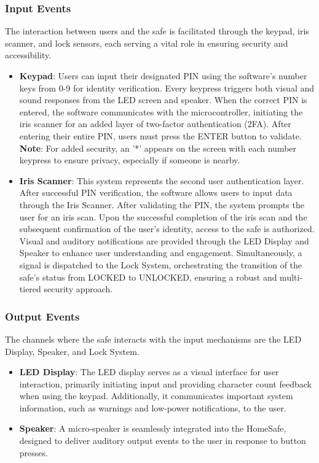\documentclass{article}
\begin{document}
\subsubsection{Input Events}
The interaction between users and the safe is facilitated through the keypad, iris scanner, and lock sensors, each serving a vital role in ensuring security and accessibility.

\begin{itemize}
    \item \textbf{Keypad}: Users can input their designated PIN using the software's number keys from 0-9 for identity verification. Every keypress triggers both visual and sound responses from the LED screen and speaker. When the correct PIN is entered, the software communicates with the microcontroller, initiating the iris scanner for an added layer of two-factor authentication (2FA). After entering their entire PIN, users must press the ENTER button to validate. \textbf{Note}: For added security, an '*' appears on the screen with each number keypress to ensure privacy, especially if someone is nearby.
    \item \textbf{Iris Scanner}: This system represents the second user authentication layer. After successful PIN verification, the software allows users to input data through the Iris Scanner. After validating the PIN, the system prompts the user for an iris scan. Upon the successful completion of the iris scan and the subsequent confirmation of the user's identity, access to the safe is authorized. Visual and auditory notifications are provided through the LED Display and Speaker to enhance user understanding and engagement. Simultaneously, a signal is dispatched to the Lock System, orchestrating the transition of the safe's status from LOCKED to UNLOCKED, ensuring a robust and multi-tiered security approach.
\end{itemize}

\subsubsection{Output Events}
The channels where the safe interacts with the input mechanisms are the LED Display, Speaker, and Lock System.
\begin{itemize}
    \item \textbf{LED Display}: The LED display serves as a visual interface for user interaction, primarily initiating input and providing character count feedback when using the keypad. Additionally, it communicates important system information, such as warnings and low-power notifications, to the user.
    \item \textbf{Speaker}: A micro-speaker is seamlessly integrated into the HomeSafe, designed to deliver auditory output events to the user in response to button presses.
\end{itemize}
\end{document}
